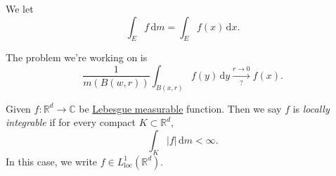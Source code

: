 \begin{notation}
	We let
	\[
		\int _E f \,\mathrm{d} m = \int _E f(x) \,\mathrm{d} x.
	\]
\end{notation}

The problem we're working on is
\[
	\frac{1}{m(B(w, r))}\int _{B(x, r)}f(y)\,\mathrm{d} y \overset{r\to 0}{\underset{?}{\longrightarrow}}f(x).
\]
\begin{definition}\label{def:locally-integrable}
	Given \(f\colon \mathbb{R} ^d \to \mathbb{C} \) be \hyperref[def:Lebesgue-measurable]{Lebesgue measurable}
	function. Then we say \(f\) is \emph{locally integrable} if for every compact \(K\subset \mathbb{R} ^d\),
	\[
		\int _K \left\vert f \right\vert \,\mathrm{d} m < \infty.
	\]
	In this case, we write \(f\in L^1_{\text{loc} }(\mathbb{R} ^d)\).
\end{definition}

